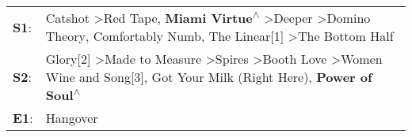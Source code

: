 \begin{supertabular}{p{0.03\textwidth}p{0.92\textwidth}}
 \textbf{S1}:  &  Catshot\textsuperscript{} \textgreater \enspace Red Tape\textsuperscript{}, \enspace \textbf{Miami Virtue\textsuperscript{$\wedge$}} \textgreater \enspace Deeper\textsuperscript{} \textgreater \enspace Domino Theory\textsuperscript{}, \enspace Comfortably Numb\textsuperscript{}, \enspace The Linear[1]\textsuperscript{} \textgreater \enspace The Bottom Half\textsuperscript{}  \enspace  \\
 \textbf{S2}:  &                     Glory[2]\textsuperscript{} \textgreater \enspace Made to Measure\textsuperscript{} \textgreater \enspace Spires\textsuperscript{} \textgreater \enspace Booth Love\textsuperscript{} \textgreater \enspace Women Wine and Song[3]\textsuperscript{}, \enspace Got Your Milk (Right Here)\textsuperscript{}, \enspace \textbf{Power of Soul\textsuperscript{$\wedge$}}  \enspace  \\
 \textbf{E1}:  &                                                                                                                                                                                                                                                                                                                                                                Hangover\textsuperscript{}  \enspace  \\
\end{supertabular}
